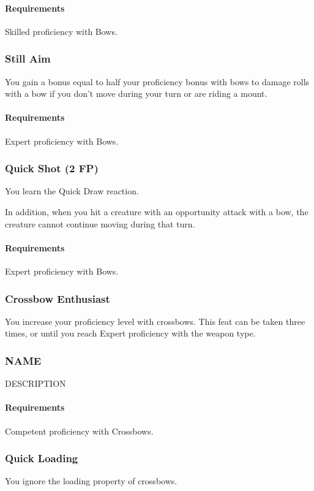     \paragraph{Requirements} Skilled proficiency with Bows.
\subsubsection{Still Aim} \label{feat::stillaim}
    You gain a bonus equal to half your proficiency bonus with bows to damage rolls with a bow if you don't move during your turn or are riding a mount.
    \paragraph{Requirements} Expert proficiency with Bows.
\subsubsection{Quick Shot (2 FP)} \label{feat::quickshot}
    You learn the Quick Draw reaction.

    In addition, when you hit a creature with an opportunity attack with a bow, the creature cannot continue moving during that turn.
    \paragraph{Requirements} Expert proficiency with Bows.
\subsubsection{Crossbow Enthusiast} \label{feat::crossbowenthusiast}
    You increase your proficiency level with crossbows.
    This feat can be taken three times, or until you reach Expert proficiency with the weapon type.
\subsubsection{NAME} \label{feat::name}
    DESCRIPTION
    \paragraph{Requirements} Competent proficiency with Crossbows.
\subsubsection{Quick Loading} \label{feat::quickloading}
    You ignore the loading property of crossbows.
